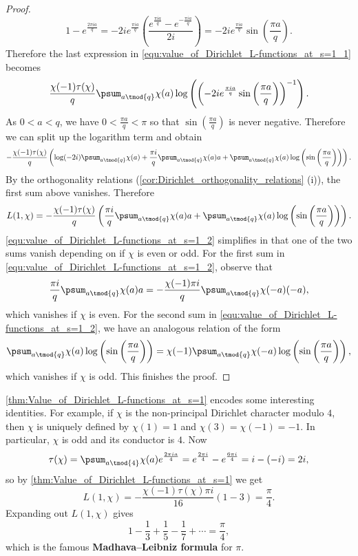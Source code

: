 \begin{proof}
        \[
          1-e^{\frac{2\pi ia}{q}} = -2ie^{\frac{\pi ia}{q}}\left(\frac{e^{\frac{\pi ia}{q}}-e^{-\frac{\pi ia}{q}}}{2i}\right) = -2ie^{\frac{\pi ia}{q}}\sin\left(\frac{\pi a}{q}\right).
        \]
        Therefore the last expression in \cref{equ:value_of_Dirichlet_L-functions_at_s=1_1} becomes
        \[
          \frac{\chi(-1)\tau(\chi)}{q}\psum_{a \tmod{q}}\chi(a)\log\left(\left(-2ie^{\frac{\pi ia}{q}}\sin\left(\frac{\pi a}{q}\right)\right)^{-1}\right).
        \]
        As $0< a < q$, we have $0 < \frac{\pi a}{q} < \pi$ so that $\sin\left(\frac{\pi a}{q}\right)$ is never negative. Therefore we can split up the logarithm term and obtain
        \[
          -\frac{\chi(-1)\tau(\chi)}{q}\left(\log(-2i)\psum_{a \tmod{q}}\chi(a)+\frac{\pi i}{q}\psum_{a \tmod{q}}\chi(a)a+\psum_{a \tmod{q}}\chi(a)\log\left(\sin\left(\frac{\pi a}{q}\right)\right)\right).
        \]
        By the orthogonality relations (\cref{cor:Dirichlet_orthogonality_relations} (i)), the first sum above vanishes. Therefore
        \begin{equation}\label{equ:value_of_Dirichlet_L-functions_at_s=1_2}
          L(1,\chi) = -\frac{\chi(-1)\tau(\chi)}{q}\left(\frac{\pi i}{q}\psum_{a \tmod{q}}\chi(a)a+\psum_{a \tmod{q}}\chi(a)\log\left(\sin\left(\frac{\pi a}{q}\right)\right)\right).
        \end{equation}
        \cref{equ:value_of_Dirichlet_L-functions_at_s=1_2} simplifies in that one of the two sums vanish depending on if $\chi$ is even or odd. For the first sum in \cref{equ:value_of_Dirichlet_L-functions_at_s=1_2}, observe that
        \[
          \frac{\pi i}{q}\psum_{a \tmod{q}}\chi(a)a = -\frac{\chi(-1)\pi i}{q}\psum_{a \tmod{q}}\chi(-a)(-a),
        \]
        which vanishes if $\chi$ is even. For the second sum in \cref{equ:value_of_Dirichlet_L-functions_at_s=1_2}, we have an analogous relation of the form
        \[
          \psum_{a \tmod{q}}\chi(a)\log\left(\sin\left(\frac{\pi a}{q}\right)\right) = \chi(-1)\psum_{a \tmod{q}}\chi(-a)\log\left(\sin\left(\frac{\pi a}{q}\right)\right),
        \]
        which vanishes if $\chi$ is odd. This finishes the proof.
      \end{proof}

      \cref{thm:Value_of_Dirichlet_L-functions_at_s=1} encodes some interesting identities. For example, if $\chi$ is the non-principal Dirichlet character modulo $4$, then $\chi$ is uniquely defined by $\chi(1) = 1$ and $\chi(3) = \chi(-1) = -1$. In particular, $\chi$ is odd and its conductor is $4$. Now
      \[
        \tau(\chi) = \psum_{a \tmod{4}}\chi(a)e^{\frac{2\pi ia}{4}} = e^{\frac{2\pi i}{4}}-e^{\frac{6\pi i}{4}} = i-(-i) = 2i,
      \]
      so by \cref{thm:Value_of_Dirichlet_L-functions_at_s=1} we get
      \[
        L(1,\chi) = -\frac{\chi(-1)\tau(\chi)\pi i}{16}(1-3) = \frac{\pi}{4}.
      \]
      Expanding out $L(1,\chi)$ gives
      \[
        1-\frac{1}{3}+\frac{1}{5}-\frac{1}{7}+\cdots = \frac{\pi}{4},
      \]
      which is the famous \textbf{Madhava–Leibniz formula} for $\pi$.
